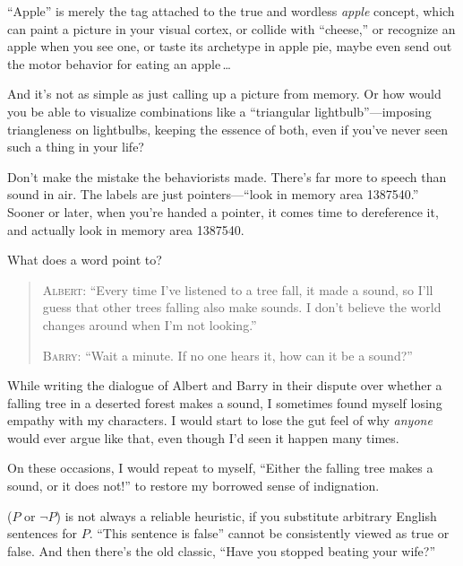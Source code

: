 { ``Apple'' is merely the tag
attached to the true and wordless \textit{apple} concept, which can
paint a picture in your visual cortex, or collide with
``cheese,'' or recognize an apple
when you see one, or taste its archetype in apple pie, maybe even send
out the motor behavior for eating an apple\,\ldots


 And it's not as simple as just calling up a
picture from memory. Or how would you be able to visualize combinations
like a ``triangular
lightbulb''---imposing triangleness on lightbulbs,
keeping the essence of both, even if you've never seen
such a thing in your life?


 Don't make the mistake the behaviorists made.
There's far more to speech than sound in air. The
labels are just pointers---``look in memory area
1387540.'' Sooner or later, when
you're handed a pointer, it comes time to dereference
it, and actually look in memory area 1387540.


 What does a word point to?

\myendsectiontext


\bigskip


\begin{quotation}

 \textsc{Albert}: ``Every time I've
listened to a tree fall, it made a sound, so I'll guess
that other trees falling also make sounds. I don't
believe the world changes around when I'm not
looking.''

{
 \textsc{Barry}: ``Wait a minute. If no one hears it, how
 can it be a sound?''}
\end{quotation}


 While writing the dialogue of Albert and Barry in their dispute
over whether a falling tree in a deserted forest makes a sound, I
sometimes found myself losing empathy with my characters. I would start
to lose the gut feel of why \textit{anyone} would ever argue like that,
even though I'd seen it happen many times.


 On these occasions, I would repeat to myself,
``Either the falling tree makes a sound, or it does
not!'' to restore my borrowed sense of indignation.


 ($P$ or $\lnot P$) is not always a reliable heuristic, if you
substitute arbitrary English sentences for $P$. ``This
sentence is false'' cannot be consistently viewed as
true or false. And then there's the old classic,
``Have you stopped beating your
wife?''


}
